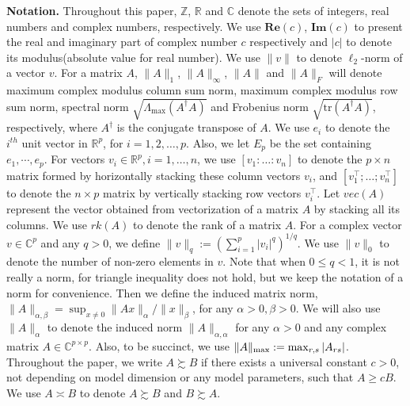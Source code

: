 \textbf{Notation.} Throughout this paper, $\mathbb{Z}$, $\mathbb{R}$ and $\mathbb{C}$  denote the sets of integers, real numbers and complex numbers, respectively. We use 
$\mathbf{Re}(c)$, $\mathbf{Im}(c)$ to present the real and imaginary part of complex number $c$ respectively and $|c|$ to denote its modulus(absolute value for real number). We use $\|v\|$ to denote $\ell_2$-norm of a vector $v$. For a matrix $A$, $\|A\|_1$, $\|A\|_{\infty}$, $\|A\|$ and $\|A\|_F$ will denote maximum complex modulus column sum norm, maximum complex modulus row sum norm, { spectral norm} $\sqrt{\Lambda_{\max}(A^\dag A)}$ and Frobenius norm $\sqrt{\text{tr}(A^\dag A)}$, respectively, where $A^\dag$ is the conjugate transpose of $A$.  We use $e_i$ to denote the $i^{th}$ unit vector in $\mathbb{R}^p$, for $i = 1, 2, \ldots, p$. Also, we let $E_p$ be the set containing $e_1, \cdots, e_p$. 
For vectors $v_i \in \mathbb{R}^p, i=1,\ldots, n$, we use $[v_1:\ldots:v_n]$ to denote the $p \times n$ matrix formed  by horizontally stacking these column vectors $v_i$, and  $[v_1^\top;\ldots; v_n^\top]$ to denote the $n\times p$ matrix by vertically stacking row vectors $v_i^\top$. Let $vec(A)$ represent the vector obtained from vectorization of a matrix $A$ by stacking all its columns. We use $rk(A)$ to denote the rank of a matrix $A$. For a complex vector $v\in \mathbb{C}^p$ and any $q > 0$, we define $\|v\|_q:= (\sum_{i=1}^p |v_i|^q)^{1/q}$. We use $\|v\|_0$ to denote the number of non-zero elements in $v$. Note that when $0\le q<1$, it is not really a norm, for triangle inequality does not hold, but we keep the notation of a norm for convenience. Then we define the induced matrix norm, $\|A\|_{\alpha, \beta} = \sup_{x\neq 0}\|Ax\|_\alpha/\|x\|_\beta$, for any  $\alpha>0, \beta>0$. We will also use $\|A\|_\alpha$ to denote the induced norm $\|A\|_{\alpha, \alpha}$ for any $\alpha > 0$ and any complex matrix $A \in \mathbb{C}^{p \times p}$. Also, to be succinct, we use $\|A\|_{\rm{max}} :=\max_{r,s}|A_{rs}|$. 
Throughout the paper, we write $A \succsim B$ if there exists a  universal constant $c > 0$, not depending on model dimension or any model parameters, such that $A \ge cB$. We use $A \asymp B$ to denote $A \succsim B$ and $B \succsim A$.  









